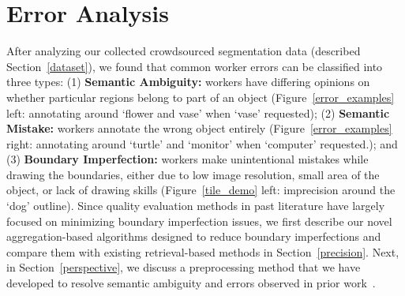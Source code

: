\vspace{-7pt}
\section{Error Analysis\label{sec:error}}
\par After analyzing our collected crowdsourced segmentation data (described Section~\ref{dataset}), we found that common worker errors can be classified into three types: (1) \textbf{Semantic Ambiguity:} workers have differing opinions on whether particular regions belong to part of an object (Figure~\ref{error_examples} left: annotating around `flower and vase' when `vase' requested); (2) \textbf{Semantic Mistake:} workers annotate the wrong object entirely (Figure~\ref{error_examples} right: annotating around `turtle' and `monitor' when `computer' requested.); and (3) \textbf{Boundary Imperfection:} workers make unintentional mistakes while drawing the boundaries, either due to low image resolution, small area of the object, or lack of drawing skills (Figure~\ref{tile_demo} left: imprecision around the `dog' outline). Since quality evaluation methods in past literature have largely focused on minimizing boundary imperfection issues, we first describe our novel aggregation-based algorithms designed to reduce boundary imperfections and compare them with existing retrieval-based methods in Section~\ref{precision}. Next, in Section~\ref{perspective}, we discuss a preprocessing method that we have developed to resolve semantic ambiguity and errors observed in prior work~\cite{Sorokin2008,Lin2014,Gurari2018}. 
